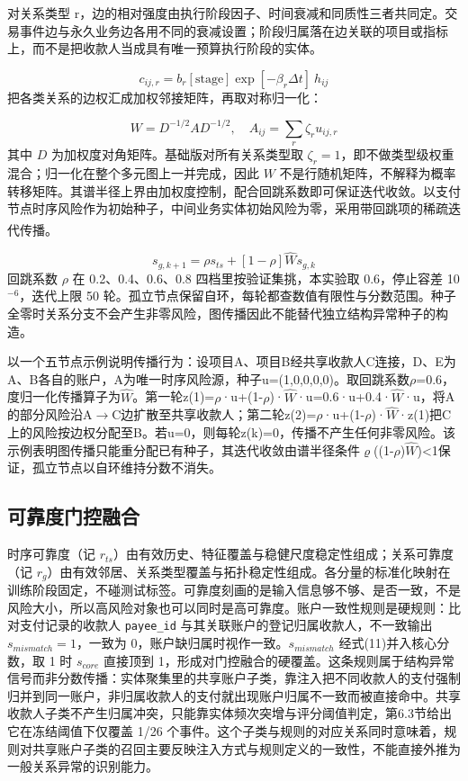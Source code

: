 \documentclass[twocolumn,11pt]{ctexart}
\newcommand{\upcite}[1]{\textsuperscript{\cite{#1}}}
\begin{document}
对关系类型 r，边的相对强度由执行阶段因子、时间衰减和同质性三者共同定。交易事件边与永久业务边各用不同的衰减设置；阶段归属落在边关联的项目或指标上，而不是把收款人当成具有唯一预算执行阶段的实体。

\begin{equation}
c_{ij,r} = b_{r}[\mathrm{stage}] \exp[-\beta_{r}\Delta t]\ h_{ij}
\end{equation}
把各类关系的边权汇成加权邻接矩阵，再取对称归一化：

\begin{equation}
W = D^{-1/2}AD^{-1/2}, \quad A_{ij} = \sum_{r}\zeta_{r}u_{ij,r}
\end{equation}
其中 $D$ 为加权度对角矩阵。基础版对所有关系类型取 $\zeta_r = 1$，即不做类型级权重混合；归一化在整个多元图上一并完成，因此 $W$ 不是行随机矩阵，不解释为概率转移矩阵。其谱半径上界由加权度控制，配合回跳系数即可保证迭代收敛。以支付节点时序风险作为初始种子，中间业务实体初始风险为零，采用带回跳项的稀疏迭代传播\upcite{ref29}。

\begin{equation}
s_{g,k+1} = \rho s_{ts} + [1 - \rho]\hat{W}s_{g,k}
\end{equation}
回跳系数 $\rho$ 在 0.2、0.4、0.6、0.8 四档里按验证集挑，本实验取 0.6，停止容差 10$^{-6}$，迭代上限 50 轮。孤立节点保留自环，每轮都查数值有限性与分数范围。种子全零时关系分支不会产生非零风险，图传播因此不能替代独立结构异常种子的构造。

以一个五节点示例说明传播行为：设项目A、项目B经共享收款人C连接，D、E为A、B各自的账户，A为唯一时序风险源，种子u=(1,0,0,0,0)。取回跳系数$\rho$=0.6，度归一化传播算子为$\hat{W}$。第一轮z(1)=$\rho$·u+(1-$\rho$)·$\hat{W}$·u=0.6·u+0.4·$\hat{W}$·u，将A的部分风险沿A$\rightarrow$C边扩散至共享收款人；第二轮z(2)=$\rho$·u+(1-$\rho$)·$\hat{W}$·z(1)把C上的风险按边权分配至B。若u=0，则每轮z(k)=0，传播不产生任何非零风险。该示例表明图传播只能重分配已有种子，其迭代收敛由谱半径条件$\varrho$((1-$\rho$)$\hat{W}$)<1保证，孤立节点以自环维持分数不消失。

\subsection{可靠度门控融合}
时序可靠度（记 $r_{ts}$）由有效历史、特征覆盖与稳健尺度稳定性组成；关系可靠度（记 $r_g$）由有效邻居、关系类型覆盖与拓扑稳定性组成。各分量的标准化映射在训练阶段固定，不碰测试标签。可靠度刻画的是输入信息够不够、是否一致，不是风险大小，所以高风险对象也可以同时是高可靠度。账户一致性规则是硬规则：比对支付记录的收款人 \texttt{payee\_id} 与其关联账户的登记归属收款人，不一致输出 $s_{mismatch}=1$，一致为 0，账户缺归属时视作一致。$s_{mismatch}$ 经式(11)并入核心分数，取 1 时 $s_{core}$ 直接顶到 1，形成对门控融合的硬覆盖。这条规则属于结构异常信号而非分数传播：实体聚集里的共享账户子类，靠注入把不同收款人的支付强制归并到同一账户，非归属收款人的支付就出现账户归属不一致而被直接命中。共享收款人子类不产生归属冲突，只能靠实体频次突增与评分阈值判定，第6.3节给出它在冻结阈值下仅覆盖 1/26 个事件。这个子类与规则的对应关系同时意味着，规则对共享账户子类的召回主要反映注入方式与规则定义的一致性，不能直接外推为一般关系异常的识别能力。
\end{document}
